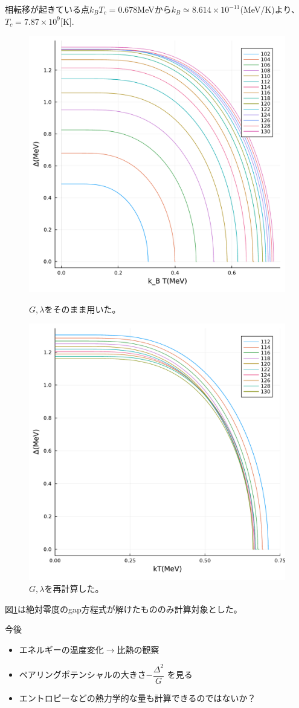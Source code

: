 \documentclass[a4paper,10pt]{jsarticle}
\begin{document}
相転移が起きている点$k_B T_c =0.678$MeVから$k_B\simeq8.614\times 10^{-11}$(MeV/K)より、$T_c=7.87\times10^{9}$[K].
\begin{figure}[H]
  \begin{minipage}[b]{0.4\textwidth}
    \centering
    \includegraphics[width=\textwidth]{CompareFT.pdf}
    \caption{$G,\lambda$をそのまま用いた。}
  \end{minipage}
  \begin{minipage}[b]{0.4\textwidth}
    \centering
    \includegraphics[width=\textwidth]{CompareFT_copy.pdf}
    \caption{$G,\lambda$を再計算した。}
    \label{fixed}
  \end{minipage}
\end{figure}
図\ref{fixed}は絶対零度のgap方程式が解けたもののみ計算対象とした。

今後
\begin{itemize}
  \item エネルギーの温度変化$\rightarrow$比熱の観察
  \item ペアリングポテンシャルの大きさ$-\dfrac{\Delta^2}{G}$ を見る
  \item エントロピーなどの熱力学的な量も計算できるのではないか？
\end{itemize}
\end{document}
